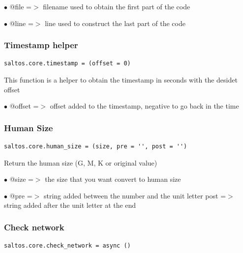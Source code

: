 \documentclass[a4paper]{article}
\begin{document}
\begin{compactitem}
\item[\color{myblue}$\bullet$] @file =$>$ filename used to obtain the first part of the code
\item[\color{myblue}$\bullet$] @line =$>$ line used to construct the last part of the code
\end{compactitem}

\hypertarget{toc161}{}
\subsubsection{Timestamp helper}

\begin{lstlisting}
saltos.core.timestamp = (offset = 0)
\end{lstlisting}

This function is a helper to obtain the timestamp in seconds with the desidet offset

\begin{compactitem}
\item[\color{myblue}$\bullet$] @offset =$>$ offset added to the timestamp, negative to go back in the time
\end{compactitem}

\hypertarget{toc162}{}
\subsubsection{Human Size}

\begin{lstlisting}
saltos.core.human_size = (size, pre = '', post = '')
\end{lstlisting}

Return the human size (G, M, K or original value)

\begin{compactitem}
\item[\color{myblue}$\bullet$] @size  =$>$ the size that you want convert to human size
\item[\color{myblue}$\bullet$] @pre  =$>$ string added between the number and the unit letter
post  =$>$ string added after the unit letter at the end
\end{compactitem}

\hypertarget{toc163}{}
\subsubsection{Check network}

\begin{lstlisting}
saltos.core.check_network = async ()
\end{lstlisting}
\end{document}
